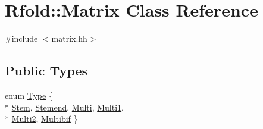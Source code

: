 \hypertarget{class_rfold_1_1_matrix}{\section{Rfold\+:\+:Matrix Class Reference}
\label{class_rfold_1_1_matrix}
}


{\ttfamily \#include $<$matrix.\+hh$>$}

\subsection*{Public Types}
\begin{DoxyCompactItemize}
\item 
enum \hyperlink{class_rfold_1_1_matrix_adb9d1d8ff7962b09506d56139ef4c0a5}{Type} \{ \\*
\hyperlink{class_rfold_1_1_matrix_adb9d1d8ff7962b09506d56139ef4c0a5a55dd6d467b29fe590028fda5b4000554}{Stem}, 
\hyperlink{class_rfold_1_1_matrix_adb9d1d8ff7962b09506d56139ef4c0a5ac5165cda64adc8e1ae5d452ad61a9ebd}{Stemend}, 
\hyperlink{class_rfold_1_1_matrix_adb9d1d8ff7962b09506d56139ef4c0a5a1695824afcdc7774aa71e6b9c0805ced}{Multi}, 
\hyperlink{class_rfold_1_1_matrix_adb9d1d8ff7962b09506d56139ef4c0a5a060ab2ad0e50cd330e36c1d57e87ea08}{Multi1}, 
\\*
\hyperlink{class_rfold_1_1_matrix_adb9d1d8ff7962b09506d56139ef4c0a5a2402adf92dc78e30e1746e94e14ee1ef}{Multi2}, 
\hyperlink{class_rfold_1_1_matrix_adb9d1d8ff7962b09506d56139ef4c0a5a30a7f8607bae95730eee1afe7d3657c7}{Multibif}
 \}
\end{DoxyCompactItemize}
